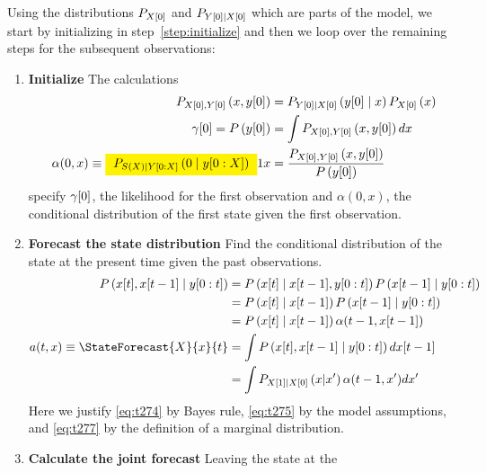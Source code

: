 Using the distributions $P_{{X}{[0]}}$ and
$P_{{Y}{[0]}\mid {X}{[0]}}$ which are parts of the model, we start
by initializing in step~\ref{step:initialize} and then we loop over
the remaining steps for the subsequent observations:
\begin{enumerate}
\item \textbf{Initialize} \label{step:initialize} The calculations
\begin{align}
  \label{eq:ContInitial}
  P_{\ti{X}{0},\ti{Y}{0}} \left(x,\ti{y}{0} \right) &=
  P_{\ti{Y}{0}\given \ti{X}{0}} \left(\ti{y}{0}\given x \right)P_{\ti{X}{0}}
  \left(x \right) \\
  \ti{\gamma}{0} = P\left(\ti{y}{0} \right) & = \int
  P_{\ti{X}{0},\ti{Y}{0}}
  \left(x,\ti{y}{0} \right) dx \\
  \alpha(0,x) \equiv \alphax{X}{0}{1}{x} &=
  \frac{P_{\ti{X}{0},\ti{Y}{0}} \left(x,\ti{y}{0}
    \right)}{P\left(\ti{y}{0} \right)}
\end{align}
specify ${\gamma}{[0]}$, the likelihood for the first observation and
$\alpha(0,x)$, the conditional distribution of the first state given
the first observation.
\item \textbf{Forecast the state distribution}  Find
  the conditional distribution of the state at the present time given
  the past observations.
\begin{align}
  \label{eq:t274}
  P\left(\ti{x}{t},\ti{x}{t-1}\given \ts{y}{0}{t} \right) &=
  P\left(\ti{x}{t}\given \ti{x}{t-1},\ts{y}{0}{t} \right)
  P\left(\ti{x}{t-1}\given \ts{y}{0}{t} \right) \\
  \label{eq:t275}
  &= P\left(\ti{x}{t}\given \ti{x}{t-1} \right)
  P\left(\ti{x}{t-1}\given \ts{y}{0}{t} \right) \\
  &= P\left(\ti{x}{t}\given \ti{x}{t-1} \right)
  \alpha(t-1,\ti{x}{t-1})\\
  \label{eq:t277}
  a(t,x) \equiv \StateForecast{X}{x}{t} &= \int
  P\left(\ti{x}{t},\ti{x}{t-1}\given \ts{y}{0}{t} \right) d\ti{x}{t-1}\\
  \label{eq:FIForecast}
  &= \int P_{\ti{X}{1} \given \ti{X}{0}} \left(x|x' \right)
    \alpha(t-1,x') dx'
\end{align}
Here we justify \eqref{eq:t274} by Bayes rule, \eqref{eq:t275} by
the model assumptions, and \eqref{eq:t277} by the definition of a
marginal distribution.
\item \textbf{Calculate the joint forecast} Leaving the state at the

\end{enumerate}
